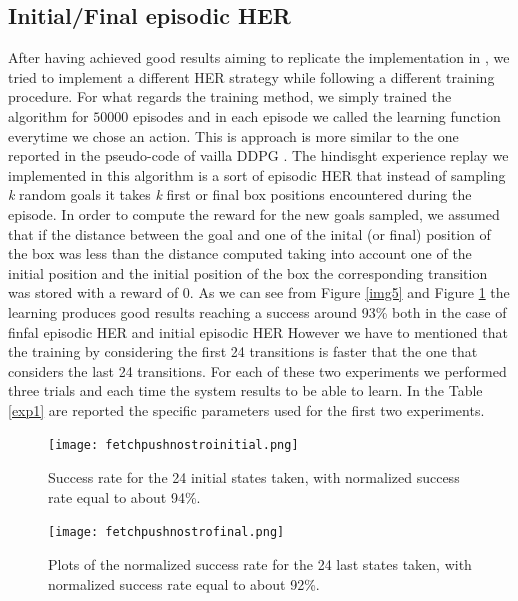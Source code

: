 \documentclass[a4paper]{report}
\begin{document}
\subsection{Initial/Final episodic HER}
After having achieved good results aiming to replicate the implementation in \cite{her}, we tried to implement a different HER strategy while following a different training procedure. For what regards the training method, we simply trained the algorithm for $50000$ episodes and in each episode we called the learning function everytime we chose an action. This is approach is more similar to the one reported in the pseudo-code of vailla DDPG \cite{ddpg}. The hindisght experience replay we implemented in this algorithm is a sort of episodic HER that instead of sampling \textit{k} random goals it takes \textit{k} first or final box positions encountered during the episode.  
In order to compute the reward for the new goals sampled, we assumed that if the distance between the goal and one of the inital (or final) position of the box was less than the distance computed taking into account one of the initial position and the initial position of the box the corresponding transition was stored with a reward of $0$.
As we can see from Figure \ref{img5} and Figure \ref{img6} the learning produces good results reaching a success around 93\% both in the case of finfal episodic HER and initial episodic HER However we have to mentioned that the training by considering the first 24 transitions is faster that the one that considers the last 24 transitions. For each of these two experiments we performed three trials and each time the system results to be able to learn. In the Table \ref{exp1} are reported the specific parameters used for the first two experiments.


\begin{figure}[h!]
\begin{minipage}[b]{0.47\textwidth}
\centering
\texttt{[image: fetchpushnostroinitial.png]}
\caption{\label{img5} Success rate for the 24 initial states taken, with normalized success rate equal to about 94\%.}
\end{minipage}
\hfill
\begin{minipage}[b]{0.47\textwidth}
\centering
\texttt{[image: fetchpushnostrofinal.png]}
\caption{\label{img6}Plots of the normalized success rate for the 24 last states taken, with normalized success rate equal to about 92\%.}
\end{minipage}
\end{figure}
\end{document}

